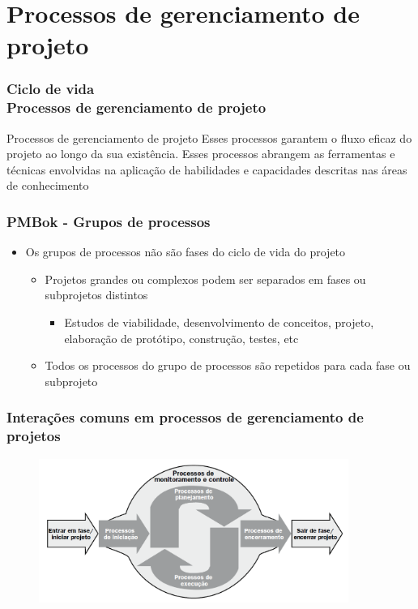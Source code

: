 \section{Processos de gerenciamento de projeto}
\begin{frame}
 \frametitle{Ciclo de vida \\
 \small{Processos de gerenciamento de projeto}}
 \begin{block}{Processos de gerenciamento de projeto}
  Esses processos garantem o fluxo eficaz do projeto
ao longo da sua existência. Esses processos abrangem as ferramentas e técnicas envolvidas na
aplicação de habilidades e capacidades descritas nas áreas de conhecimento
 \end{block}
\end{frame}

\begin{frame}
 \frametitle{PMBok - Grupos de processos}
 \begin{itemize}
  \item Os grupos de processos  não são fases  do ciclo de vida do projeto
  \begin{itemize}
   \item Projetos grandes  ou complexos podem ser separados em fases ou subprojetos distintos
   \begin{itemize}
    \item Estudos de viabilidade, desenvolvimento de conceitos, projeto, elaboração de protótipo, construção, testes, etc
   \end{itemize}
  \item Todos os processos do grupo de processos são repetidos para cada fase ou subprojeto
  \end{itemize}
  \end{itemize}
\end{frame}

\begin{frame}
 \frametitle{Interações comuns em processos de gerenciamento de projetos}
  \centering
  \begin{figure}
 \includegraphics[width = 0.9\textwidth]{figs/fig12_v2.png}
\end{figure}
\end{frame}

